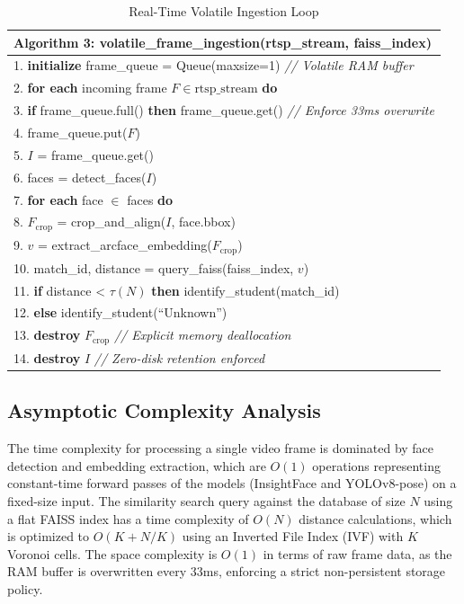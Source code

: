 \documentclass[12pt,a4paper,oneside]{report}
\begin{document}
\begin{table}[htbp]
\caption{Real-Time Volatile Ingestion Loop}
\centering
\small
{}
\begin{tabular}{p{5.5in}}
\hline
\textbf{Algorithm 3: volatile\_frame\_ingestion(rtsp\_stream, faiss\_index)} \\ \hline
1. \textbf{initialize} frame\_queue = Queue(maxsize=1) \textit{// Volatile RAM buffer} \\
2. \textbf{for each} incoming frame $F \in \text{rtsp\_stream}$ \textbf{do} \\
3. \quad \textbf{if} frame\_queue.full() \textbf{then} frame\_queue.get() \textit{// Enforce 33ms overwrite} \\
4. \quad frame\_queue.put($F$) \\
5. \quad $I$ = frame\_queue.get() \\
6. \quad faces = detect\_faces($I$) \\
7. \quad \textbf{for each} face $\in$ faces \textbf{do} \\
8. \quad\quad $F_{\text{crop}}$ = crop\_and\_align($I$, face.bbox) \\
9. \quad\quad $v$ = extract\_arcface\_embedding($F_{\text{crop}}$) \\
10. \quad\quad match\_id, distance = query\_faiss(faiss\_index, $v$) \\
11. \quad\quad \textbf{if} distance < $\tau(N)$ \textbf{then} identify\_student(match\_id) \\
12. \quad\quad \textbf{else} identify\_student(``Unknown'') \\
13. \quad\quad \textbf{destroy} $F_{\text{crop}}$ \textit{// Explicit memory deallocation} \\
14. \quad \textbf{destroy} $I$ \textit{// Zero-disk retention enforced} \\ \hline
\end{tabular}
\label{tab:volatile_ingestion}
\end{table}

\subsection{Asymptotic Complexity Analysis}
The time complexity for processing a single video frame is dominated by face detection and embedding extraction, which are $O(1)$ operations representing constant-time forward passes of the models (InsightFace and YOLOv8-pose) on a fixed-size input. The similarity search query against the database of size $N$ using a flat FAISS index has a time complexity of $O(N)$ distance calculations, which is optimized to $O(K + N/K)$ using an Inverted File Index (IVF) with $K$ Voronoi cells. The space complexity is $O(1)$ in terms of raw frame data, as the RAM buffer is overwritten every 33ms, enforcing a strict non-persistent storage policy.
\end{document}
